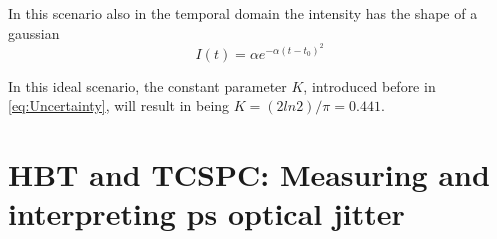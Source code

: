 In this scenario also in the temporal domain the intensity has the shape of a gaussian 
\begin{equation}
    I(t)=\alpha e^{-\alpha (t-t_0)^2}
\label{eq:exampleTemporal}
\end{equation}

In this ideal scenario, the constant parameter $K$, introduced before in \autoref{eq:Uncertainty}, will result in being $K = (2ln2)/\pi = 0.441$.


\section{HBT and TCSPC: Measuring and interpreting ps optical jitter}
\label{sec:Def-Techniques}


